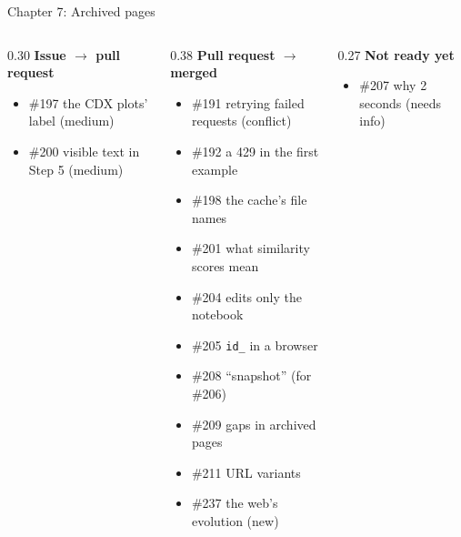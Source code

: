 \documentclass[9pt,aspectratio=169]{beamer}
\begin{document}
\begin{frame}{Chapter 7: Archived pages}
    \begin{columns}[T]
        \begin{column}{0.30\textwidth}
            \textbf{Issue $\to$ pull request}
            \begin{itemize}\small
                \item \#197 the CDX plots' label (medium)
                \item \#200 visible text in Step 5 (medium)
            \end{itemize}
        \end{column}
        \begin{column}{0.38\textwidth}
            \textbf{Pull request $\to$ merged}
            \begin{itemize}\small
                \item \#191 retrying failed requests (conflict)
                \item \#192 a 429 in the first example
                \item \#198 the cache's file names
                \item \#201 what similarity scores mean
                \item \#204 edits only the notebook
                \item \#205 \texttt{id\_} in a browser
                \item \#208 ``snapshot'' (for \#206)
                \item \#209 gaps in archived pages
                \item \#211 URL variants
                \item \#237 the web's evolution (new)
            \end{itemize}
        \end{column}
        \begin{column}{0.27\textwidth}
            \textbf{Not ready yet}
            \begin{itemize}\small
                \item \#207 why 2 seconds (needs info)
            \end{itemize}
        \end{column}
    \end{columns}
\end{frame}
\end{document}
